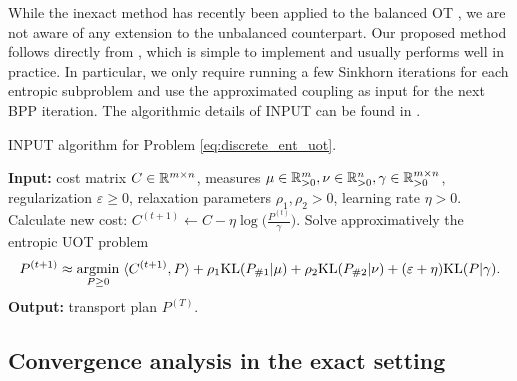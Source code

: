 While the inexact method has recently been applied to the balanced OT \citep{Xie20,Yang22},
we are not aware of any extension to the unbalanced counterpart.
Our proposed method follows directly from \citep{Xie20}, which is simple to implement and
usually performs well in practice. In particular,
we only require running a few Sinkhorn iterations for each entropic subproblem and
use the approximated coupling as input for the next BPP iteration.
The algorithmic details of INPUT can be found in .
\begin{algorithm}[t]
  \caption{INPUT algorithm for Problem \eqref{eq:discrete_ent_uot}.}
  \label{alg:isppa}
\begin{algorithmic}[1]
  \STATE \textbf{Input:} cost matrix $C \in \mathbb R^{m \times n}$,
  measures $\mu \in \mathbb R^m_{> 0}, \nu \in \mathbb R^n_{> 0}, \gamma \in \mathbb R^{m \times n}_{> 0}$,
  regularization $\varepsilon \geq 0$, relaxation parameters $\rho_1, \rho_2 > 0$,
  learning rate $\eta > 0$.
  \STATE Calculate new cost: $C^{(t+1)} \gets C - \eta \log \Big( \frac{P^{(t)}}{\gamma} \Big)$.
  \STATE Solve approximatively the entropic UOT problem
  \begin{align}
    P^{(t+1)} \approx \operatorname*{argmin}_{P \geq 0} \; \langle C^{(t+1)}, P \rangle +
    \rho_1 \text{KL}(P_{\# 1} | \mu) + \rho_2 \text{KL}(P_{\# 2} | \nu) + (\varepsilon + \eta) \text{KL}(P | \gamma).
  \end{align}
  \ENDFOR
  \STATE \textbf{Output:} transport plan $P^{(T)}$.
\end{algorithmic}
\end{algorithm}

\subsection{Convergence analysis in the exact setting}


